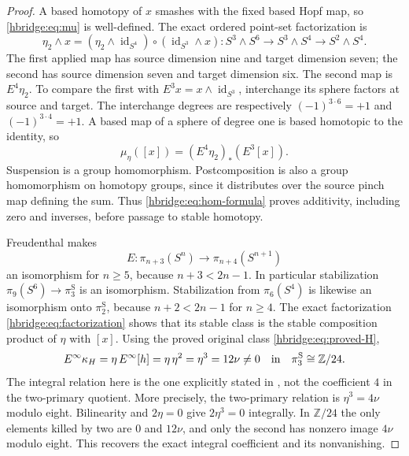 \documentclass[11pt,letterpaper]{article}
\numberwithin{equation}{section}
\theoremstyle{definition}
\theoremstyle{remark}
\begin{document}
\begin{proof}
A based homotopy of \(x\) smashes with the fixed based Hopf map,
so \eqref{hbridge:eq:mu} is well-defined. The exact ordered
point-set factorization is
\begin{equation}
\eta_2\wedge x
=(\eta_2\wedge\operatorname{id}_{S^4})
 \circ(\operatorname{id}_{S^3}\wedge x):
S^3\wedge S^6\longrightarrow S^3\wedge S^4
\longrightarrow S^2\wedge S^4.
\label{hbridge:eq:factorization}
\end{equation}
The first applied map has source dimension nine and target dimension
seven; the second has source dimension seven and target dimension six.
The second map is \(E^4\eta_2\). To compare the first with
\(E^3x=x\wedge\operatorname{id}_{S^3}\), interchange its sphere
factors at source and target. The interchange degrees are respectively
\((-1)^{3\cdot6}=+1\) and \((-1)^{3\cdot4}=+1\). A based map
of a sphere of degree one is based homotopic to the identity, so
\begin{equation}
\mu_\eta([x])=(E^4\eta_2)_*(E^3[x]).
\label{hbridge:eq:hom-formula}
\end{equation}
Suspension is a group homomorphism. Postcomposition is also a group
homomorphism on homotopy groups, since it distributes over the
source pinch map defining the sum. Thus
\eqref{hbridge:eq:hom-formula} proves additivity, including zero
and inverses, before passage to stable homotopy.

Freudenthal makes
\[
E:\pi_{n+3}(S^n)\longrightarrow\pi_{n+4}(S^{n+1})
\]
an isomorphism for \(n\ge5\), because \(n+3<2n-1\).
In particular stabilization
\(\pi_9(S^6)\to\pi_3^{\mathrm S}\) is an isomorphism.
Stabilization from \(\pi_6(S^4)\) is likewise an isomorphism
onto \(\pi_2^{\mathrm S}\), because \(n+2<2n-1\) for
\(n\ge4\). The exact factorization
\eqref{hbridge:eq:factorization} shows that its stable class is
the stable composition product of \(\eta\) with \([x]\).
Using the proved original class \eqref{hbridge:eq:proved-H},
\begin{equation}
E^\infty\kappa_H
=\eta\,E^\infty[h]
=\eta\,\eta^2
=\eta^3
=12\nu\ne0\quad\hbox{in}\quad
\pi_3^{\mathrm S}\cong\mathbb Z/24.
\label{hbridge:eq:stable-product}
\end{equation}
The integral relation here is the one explicitly stated in
\cite[p.~385]{hbridgebib:HBHatcher}, not the coefficient \(4\) in the
two-primary quotient. More precisely, the two-primary relation
is \(\eta^3=4\nu\) modulo eight. Bilinearity and \(2\eta=0\)
give \(2\eta^3=0\) integrally. In \(\mathbb Z/24\) the only
elements killed by two are \(0\) and \(12\nu\), and only the
second has nonzero image \(4\nu\) modulo eight. This recovers
the exact integral coefficient and its nonvanishing.


\end{proof}
\end{document}
